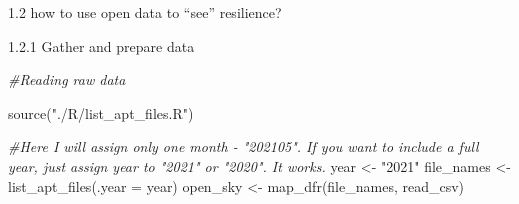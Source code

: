 \documentclass[conference,final,]{IEEEtran}
\newenvironment{Shaded}{\begin{snugshade}}{\end{snugshade}}
\newcommand{\AttributeTok}[1]{\textcolor[rgb]{0.77,0.63,0.00}{#1}}
\newcommand{\CommentTok}[1]{\textcolor[rgb]{0.56,0.35,0.01}{\textit{#1}}}
\newcommand{\FunctionTok}[1]{\textcolor[rgb]{0.00,0.00,0.00}{#1}}
\newcommand{\NormalTok}[1]{#1}
\newcommand{\OtherTok}[1]{\textcolor[rgb]{0.56,0.35,0.01}{#1}}
\newcommand{\StringTok}[1]{\textcolor[rgb]{0.31,0.60,0.02}{#1}}
\begin{document}
1.2 how to use open data to ``see'' resilience?

1.2.1 Gather and prepare data

\begin{Shaded}
\begin{Highlighting}[]
\CommentTok{\#Reading raw data}

\FunctionTok{source}\NormalTok{(}\StringTok{"./R/list\_apt\_files.R"}\NormalTok{)}

\CommentTok{\#Here I will assign only one month {-} "202105". If you want to include a full year, just assign year to "2021" or "2020". It works.}
\NormalTok{year }\OtherTok{\textless{}{-}} \StringTok{"2021"}
\NormalTok{file\_names }\OtherTok{\textless{}{-}} \FunctionTok{list\_apt\_files}\NormalTok{(}\AttributeTok{.year =}\NormalTok{ year)}
\NormalTok{open\_sky }\OtherTok{\textless{}{-}} \FunctionTok{map\_dfr}\NormalTok{(file\_names, read\_csv)}
\end{Highlighting}
\end{Shaded}
\end{document}
